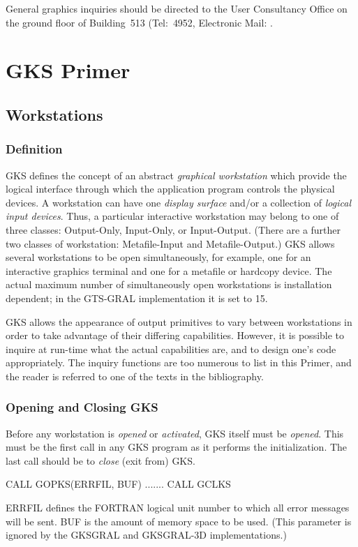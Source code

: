 General graphics inquiries should be directed to the User Consultancy Office
on the ground floor of Building~513 (Tel:~4952,
Electronic Mail: .
\chapter{\protect\label{sec:gkspr}GKS Primer}
\section{Workstations}
\subsection{Definition}
 
GKS defines the concept of an abstract {\it graphical workstation}
which provide the logical interface through which the application
program controls the physical devices.
A workstation can have one {\it display surface} and/or a collection
of {\it logical input devices}.
Thus, a particular interactive workstation may
belong to one of three classes: Output-Only, Input-Only,
or Input-Output. (There are a further two classes of
workstation: Metafile-Input and Metafile-Output.)
GKS allows several workstations to be open simultaneously,
for example, one for an interactive graphics terminal
and one for a metafile or hardcopy device.
The actual maximum number of simultaneously open workstations is
installation dependent; in the GTS-GRAL implementation it is set to 15.
 
GKS allows the appearance of output primitives to vary between
workstations in order to take advantage of their differing
capabilities. However, it is possible to inquire at run-time what
the actual capabilities are, and to design one's code appropriately.
The inquiry functions are too numerous to list in this Primer,
and the reader is referred to one of the texts in the bibliography.
 
\subsection{Opening and Closing GKS}
 
Before any workstation is {\it opened} or {\it activated},
GKS itself must be {\it opened}.
This must be the first call in any GKS program
as it performs the initialization.
The last call should be to {\it close} (exit from) GKS.
\begin{XMP}
CALL GOPKS(ERRFIL, BUF)
  .......
CALL GCLKS
\end{XMP}
ERRFIL defines the FORTRAN logical unit number to which all error
messages will be sent. BUF is the amount of memory space to be
used. (This parameter is ignored by the GKSGRAL and GKSGRAL-3D implementations.)

